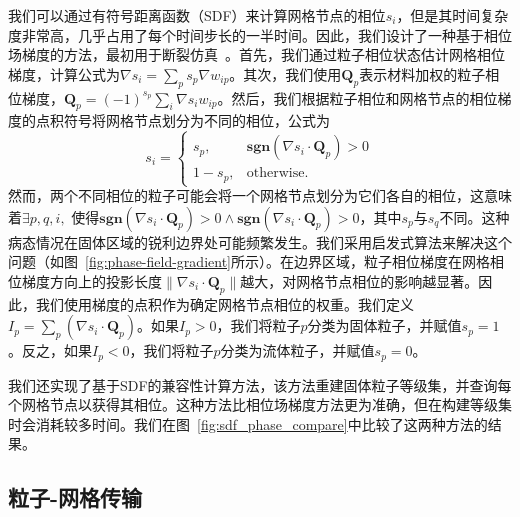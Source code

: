 我们可以通过有符号距离函数（SDF）来计算网格节点的相位$s_i$，但是其时间复杂度非常高，几乎占用了每个时间步长的一半时间。因此，我们设计了一种基于相位场梯度的方法，最初用于断裂仿真~\cite{homel2017field}。首先，我们通过粒子相位状态估计网格相位梯度，计算公式为$\nabla s_i = \sum_{p} s_p \nabla w_{ip}$。其次，我们使用$\mathbf{Q}_p$表示材料加权的粒子相位梯度，$\mathbf{Q}_p = (-1)^{s_p}\sum_{i} \nabla s_i w_{ip}$。然后，我们根据粒子相位和网格节点的相位梯度的点积符号将网格节点划分为不同的相位，公式为
\begin{equation}
s_{i}=
\begin{cases} 
s_p, &  \textbf{sgn}(\nabla s_i \cdot \mathbf{Q}_p) > 0 \\
1 - s_p, & \text{otherwise}.
\end{cases}
\end{equation}
然而，两个不同相位的粒子可能会将一个网格节点划分为它们各自的相位，这意味着$\exists p, q, i,$ 使得$\textbf{sgn}(\nabla s_i \cdot \mathbf{Q}_p) > 0 \land \textbf{sgn}(\nabla s_i \cdot \mathbf{Q}_p) > 0$，其中$s_p$与$s_q$不同。这种病态情况在固体区域的锐利边界处可能频繁发生。我们采用启发式算法来解决这个问题（如图~\ref{fig:phase-field-gradient}所示）。在边界区域，粒子相位梯度在网格相位梯度方向上的投影长度$\| \nabla s_i \cdot \mathbf{Q}_p \|$越大，对网格节点相位的影响越显著。因此，我们使用梯度的点积作为确定网格节点相位的权重。\color{red}我们定义$I_p=\sum_{p}(\nabla s_i \cdot \mathbf{Q}_p)$。如果$I_p > 0$，我们将粒子$p$分类为固体粒子，并赋值$s_p=1$。反之，如果$I_p<0$，我们将粒子$p$分类为流体粒子，并赋值$s_p=0$。\color{black}

我们还实现了基于SDF的兼容性计算方法，该方法重建固体粒子等级集，并查询每个网格节点以获得其相位。这种方法比相位场梯度方法更为准确，但在构建等级集时会消耗较多时间。我们在图~\ref{fig:sdf_phase_compare}中比较了这两种方法的结果。


\subsection{粒子-网格传输}
